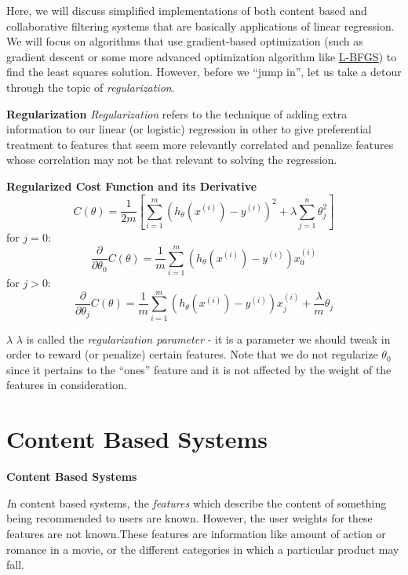 \documentclass[xcolor=dvipsnames]{beamer}
\begin{document}
\begin{frame}
Here, we will discuss simplified implementations of both content based and collaborative filtering systems that are basically applications of linear regression. \vfill\pause We will focus on algorithms that use gradient-based optimization (such as gradient descent or some more advanced optimization algorithm like \href{https://en.wikipedia.org/wiki/L-BFGS}{L-BFGS}) to find the least squares solution. \vfill\pause However, before we ``jump in'', let us take a detour through the topic of \emph{regularization}.\\
\end{frame}

\begin{frame}[fragile]
{\bf Regularization}
\emph{Regularization} refers to the technique of adding extra information to our linear (or logistic) regression in other to give preferential treatment to features that seem more relevantly correlated and penalize features whose correlation may not be that relevant to solving the regression.
\end{frame}

\begin{frame}
{\bf Regularized Cost Function and its Derivative}
\[
C(\theta) = \frac{1}{2m}\left[\sum_{i = 1}^m(h_{\theta}(x^{(i)}) - y^{(i)})^2 + \lambda\sum_{j=1}^n \theta_j^2\right]
\]
\pause
for $j=0$:
\[
\frac{\partial}{\partial \theta_0}C(\theta) = \frac{1}{m}\sum_{i=1}^m(h_{\theta}(x^{(i)})-y^{(i)})x^{(i)}_0
\]
\pause
for $j > 0$:
\[
\frac{\partial}{\partial \theta_j}C(\theta) = \frac{1}{m}\sum_{i=1}^m(h_{\theta}(x^{(i)})-y^{(i)})x^{(i)}_j + \frac{\lambda}{m}\theta_j
\]
\end{frame}

\begin{frame}
{\bf $\lambda$}
$\lambda$ is called the \emph{regularization parameter} - it is a parameter we should tweak in order to reward (or penalize) certain features. \vfill\pause Note that we do not regularize $\theta_0$ since it pertains to the ``ones'' feature and it is not affected by the weight of the features in consideration.
\end{frame}

\section{Content Based Systems}
\begin{frame}
{\bf Content Based Systems}

{\it\huge I}n content based systems, the \emph{features} which describe the content of something being recommended to users are known. \vfill\pause However, the user weights for these features are not known.\vfill\pause These features are information like amount of action or romance in a movie, or the different categories in which a particular product may fall. 
\end{frame}
\end{document}
